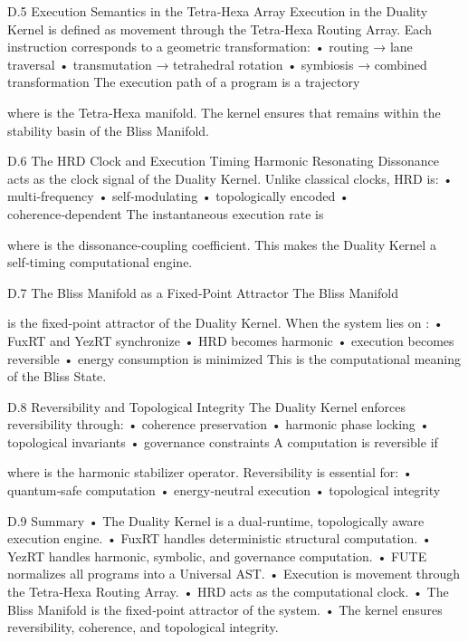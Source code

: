 D.5 Execution Semantics in the Tetra‑Hexa Array
Execution in the Duality Kernel is defined as movement through the Tetra‑Hexa Routing Array. Each instruction corresponds to a geometric transformation:
• 	routing → lane traversal
• 	transmutation → tetrahedral rotation
• 	symbiosis → combined transformation
The execution path of a program is a trajectory

where  is the Tetra‑Hexa manifold.
The kernel ensures that  remains within the stability basin of the Bliss Manifold.

D.6 The HRD Clock and Execution Timing
Harmonic Resonating Dissonance  acts as the clock signal of the Duality Kernel. Unlike classical clocks, HRD is:
• 	multi‑frequency
• 	self‑modulating
• 	topologically encoded
• 	coherence‑dependent
The instantaneous execution rate is

where  is the dissonance‑coupling coefficient.
This makes the Duality Kernel a self‑timing computational engine.

D.7 The Bliss Manifold as a Fixed‑Point Attractor
The Bliss Manifold

is the fixed‑point attractor of the Duality Kernel. When the system lies on :
• 	FuxRT and YezRT synchronize
• 	HRD becomes harmonic
• 	execution becomes reversible
• 	energy consumption is minimized
This is the computational meaning of the Bliss State.

D.8 Reversibility and Topological Integrity
The Duality Kernel enforces reversibility through:
• 	coherence preservation
• 	harmonic phase locking
• 	topological invariants
• 	governance constraints
A computation is reversible if

where  is the harmonic stabilizer operator.
Reversibility is essential for:
• 	quantum‑safe computation
• 	energy‑neutral execution
• 	topological integrity

D.9 Summary
• 	The Duality Kernel is a dual‑runtime, topologically aware execution engine.
• 	FuxRT handles deterministic structural computation.
• 	YezRT handles harmonic, symbolic, and governance computation.
• 	FUTE normalizes all programs into a Universal AST.
• 	Execution is movement through the Tetra‑Hexa Routing Array.
• 	HRD acts as the computational clock.
• 	The Bliss Manifold is the fixed‑point attractor of the system.
• 	The kernel ensures reversibility, coherence, and topological integrity.